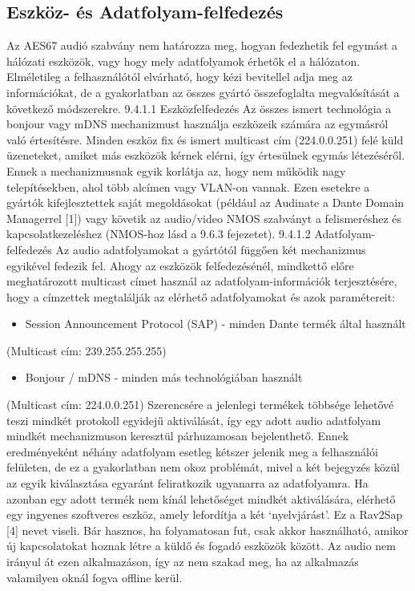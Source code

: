 \subsection{Eszköz- és Adatfolyam-felfedezés}
Az AES67 audió szabvány nem határozza meg, hogyan fedezhetik fel egymást a
hálózati eszközök, vagy hogy mely adatfolyamok érhetők el a hálózaton.
Elméletileg a felhasználótól elvárható, hogy kézi bevitellel adja meg az
információkat, de a gyakorlatban az összes gyártó összefoglalta megvalósítását a
következő módszerekre. 9.4.1.1 Eszközfelfedezés Az összes ismert technológia a
bonjour vagy mDNS mechanizmust használja eszközeik számára az egymásról való
értesítésre. Minden eszköz fix és ismert multicast cím (224.0.0.251) felé küld
üzeneteket, amiket más eszközök kérnek elérni, így értesülnek egymás létezéséről.
Ennek a mechanizmusnak egyik korlátja az, hogy nem működik nagy telepítésekben,
ahol több alcímen vagy VLAN-on vannak. Ezen esetekre a gyártók kifejlesztettek
saját megoldásokat (például az Audinate a Dante Domain Managerrel [1]) vagy
követik az audio/video NMOS szabványt a felismeréshez és kapcsolatkezeléshez
(NMOS-hoz lásd a 9.6.3 fejezetet). 9.4.1.2 Adatfolyam-felfedezés Az audio
adatfolyamokat a gyártótól függően két mechanizmus egyikével fedezik fel. Ahogy
az eszközök felfedezésénél, mindkettő előre meghatározott multicast címet
használ az adatfolyam-információk terjesztésére, hogy a címzettek megtalálják az
elérhető adatfolyamokat és azok paramétereit:

\begin{itemize}
	\item Session Announcement Protocol (SAP) - minden Dante termék által használt
\end{itemize}
(Multicast cím: 239.255.255.255)

\begin{itemize}
	\item Bonjour / mDNS - minden más technológiában használt
\end{itemize}
(Multicast cím: 224.0.0.251) Szerencsére a jelenlegi termékek többsége
lehetővé teszi mindkét protokoll egyidejű aktiválását, így egy adott audio
adatfolyam mindkét mechanizmuson keresztül párhuzamosan bejelenthető. Ennek
eredményeként néhány adatfolyam esetleg kétszer jelenik meg a felhasználói
felületen, de ez a gyakorlatban nem okoz problémát, mivel a két bejegyzés közül
az egyik kiválasztása egyaránt feliratkozik ugyanarra az adatfolyamra. Ha
azonban egy adott termék nem kínál lehetőséget mindkét aktiválására, elérhető
egy ingyenes szoftveres eszköz, amely lefordítja a két `nyelvjárást'. Ez a
Rav2Sap [4] nevet viseli. Bár hasznos, ha folyamatosan fut, csak akkor
használható, amikor új kapcsolatokat hoznak létre a küldő és fogadó eszközök
között. Az audio nem irányul át ezen alkalmazáson, így az nem szakad meg, ha az
alkalmazás valamilyen oknál fogva offline kerül.

